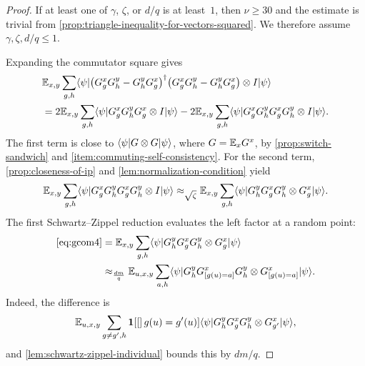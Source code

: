\begin{proof}
	\leanok
	If at least one of $\gamma$, $\zeta$, or $d/q$ is at least~$1$, then $\nu \ge 30$ and the estimate is trivial from \ref{prop:triangle-inequality-for-vectors-squared}. We therefore assume $\gamma,\zeta,d/q \le 1$.

	Expanding the commutator square gives
	\begin{align}
		 & \mathbb{E}_{x,y} \sum_{g,h}
		\langle \psi \rvert
		\bigl(G_g^x G_h^y - G_h^y G_g^x\bigr)^\dagger
		\bigl(G_g^x G_h^y - G_h^y G_g^x\bigr)
		\otimes I \lvert \psi \rangle\nonumber  \\
		 & = 2 \mathbb{E}_{x,y} \sum_{g,h}
		\langle \psi \rvert G_g^x G_h^y G_g^x \otimes I \lvert \psi \rangle
		- 2 \mathbb{E}_{x,y} \sum_{g,h}
		\langle \psi \rvert G_g^x G_h^y G_g^x G_h^y \otimes I \lvert \psi \rangle.
		\label{eq:gcomterms}
	\end{align}
	The first term is close to $\langle \psi \rvert G \otimes G \lvert \psi \rangle$, where $G=\mathbb{E}_x G^x$, by \ref{prop:switch-sandwich} and \ref{item:commuting-self-consistency}. For the second term, \ref{prop:closeness-of-ip} and \ref{lem:normalization-condition} yield
	\begin{equation}
		\mathbb{E}_{x,y} \sum_{g,h}
		\langle \psi \rvert G_g^x G_h^y G_g^x G_h^y \otimes I \lvert \psi \rangle
		\approx_{\sqrt{\zeta}}
		\mathbb{E}_{x,y} \sum_{g,h}
		\langle \psi \rvert G_h^y G_g^x G_h^y \otimes G_g^x \lvert \psi \rangle.
		\label{eq:gcom4}
	\end{equation}
	The first Schwartz--Zippel reduction evaluates the left factor at a random point:
	\begin{align}
		\eqref{eq:gcom4}
		 & = \mathbb{E}_{x,y} \sum_{g,h}
		\langle \psi \rvert G_h^y G_g^x G_h^y \otimes G_g^x \lvert \psi \rangle\nonumber \\
		 & \approx_{\frac{dm}{q}}
		\mathbb{E}_{u,x,y} \sum_{a,h}
		\langle \psi \rvert G_h^y G^x_{[g(u)=a]} G_h^y \otimes G^x_{[g(u)=a]} \lvert \psi \rangle.
		\label{eq:evaluate-gcom-at-points}
	\end{align}
	Indeed, the difference is
	\begin{equation}\label{eq:gcom4-diff}
		\mathbb{E}_{u,x,y} \sum_{g \neq g',h}
		\mathbf{1}\!\left[[\right]g(u)=g'(u)]
		\langle \psi \rvert G_h^y G_g^x G_h^y \otimes G_{g'}^x \lvert \psi \rangle,
	\end{equation}
	and \ref{lem:schwartz-zippel-individual} bounds this by $dm/q$.


\end{proof}
